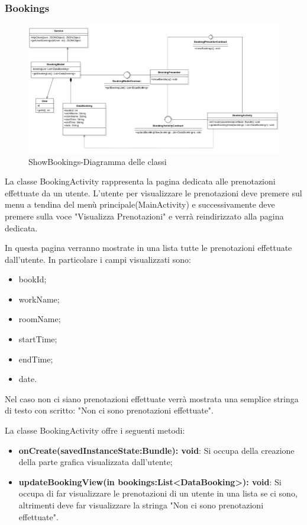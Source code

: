 \subsubsection{Bookings}
\begin{figure}[H]
	\centering
	\includegraphics[width=16cm]{res/images/apputenti-ShowBookingsClass.png}
	\caption{ShowBookings-Diagramma delle classi}
	\label{fig:ShowBookings-Diagramma delle classi}
\end{figure}
La classe BookingActivity rappresenta la pagina dedicata alle prenotazioni effettuate da un utente. L'utente per visualizzare le prenotazioni deve premere sul menu a tendina del menù principale(MainActivity) e successivamente deve premere sulla voce "Visualizza Prenotazioni" e verrà reindirizzato alla pagina dedicata.

In questa pagina verranno mostrate in una lista tutte le prenotazioni effettuate dall'utente. In particolare i campi visualizzati sono: 
\begin{itemize}
	\item bookId; 
	\item workName; 
	\item roomName; 
	\item startTime; 
	\item endTime; 
	\item date. 
\end{itemize}
Nel caso non ci siano prenotazioni effettuate verrà mostrata una semplice stringa di testo con scritto: "Non ci sono prenotazioni effettuate".

La classe BookingActivity offre i seguenti metodi:
\begin{itemize}
	\item \textbf{onCreate(savedInstanceState:Bundle): void}: Si occupa della creazione della parte grafica visualizzata dall'utente; 
	\item \textbf{updateBookingView(in bookings:List<DataBooking>): void}: Si occupa di far visualizzare le prenotazioni di un utente in una lista se ci sono, altrimenti deve far visualizzare la stringa "Non ci sono prenotazioni effettuate". 
\end{itemize}

